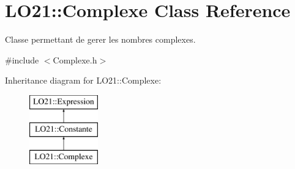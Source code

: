 \hypertarget{class_l_o21_1_1_complexe}{\section{\-L\-O21\-:\-:\-Complexe \-Class \-Reference}
\label{class_l_o21_1_1_complexe}
}


\-Classe permettant de gerer les nombres complexes.  




{\ttfamily \#include $<$\-Complexe.\-h$>$}

\-Inheritance diagram for \-L\-O21\-:\-:\-Complexe\-:\begin{figure}[H]
\begin{center}
\leavevmode
\includegraphics[height=3.000000cm]{class_l_o21_1_1_complexe}
\end{center}
\end{figure}
